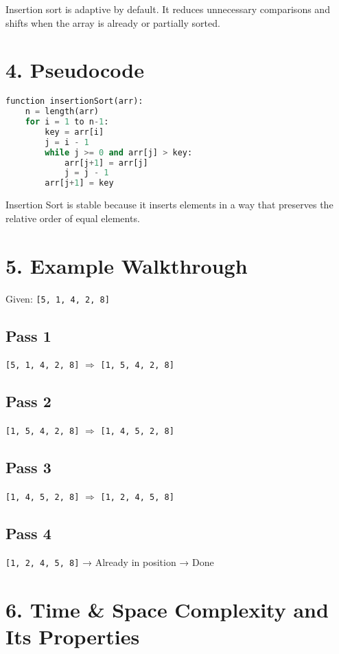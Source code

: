 \documentclass[14pt]{extarticle}
\begin{document}
Insertion sort is adaptive by default. It reduces unnecessary comparisons and shifts when the array is already or partially sorted.

\section*{4. Pseudocode}

\begin{lstlisting}[language=Python]
function insertionSort(arr):
    n = length(arr)
    for i = 1 to n-1:
        key = arr[i]
        j = i - 1
        while j >= 0 and arr[j] > key:
            arr[j+1] = arr[j]
            j = j - 1
        arr[j+1] = key
\end{lstlisting}

\begin{tcolorbox}[
  colback=white,
  colframe=black,
  title=Stability Note
]
Insertion Sort is stable because it inserts elements in a way that preserves the relative order of equal elements.
\end{tcolorbox}

\section*{5. Example Walkthrough}

Given: \texttt{[5, 1, 4, 2, 8]}

\subsection*{Pass 1}
\texttt{[5, 1, 4, 2, 8]} $\Rightarrow$ \texttt{[1, 5, 4, 2, 8]}

\subsection*{Pass 2}
\texttt{[1, 5, 4, 2, 8]} $\Rightarrow$ \texttt{[1, 4, 5, 2, 8]}

\subsection*{Pass 3}
\texttt{[1, 4, 5, 2, 8]} $\Rightarrow$ \texttt{[1, 2, 4, 5, 8]}

\subsection*{Pass 4}
\texttt{[1, 2, 4, 5, 8]} → Already in position → Done

\section*{6. Time \& Space Complexity and Its Properties}
\end{document}
